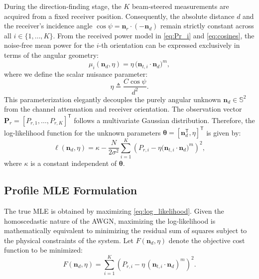 \documentclass[journal]{IEEEtran}
\begin{document}
During the direction-finding stage, the $K$ beam-steered measurements are acquired from a fixed receiver position. Consequently, the absolute distance $d$ and the receiver's incidence angle $\cos\psi = \mathbf{n}_r \cdot (-\mathbf{n}_d)$ remain strictly constant across all $i \in \{1, \dots, K\}$. From the received power model in \eqref{eq:Pr_i} and \eqref{eq:cosines}, the noise-free mean power for the $i$-th orientation can be expressed exclusively in terms of the angular geometry:
\begin{equation}
    \mu_i(\mathbf{n}_d, \eta) = \eta\,\bigl(\mathbf{n}_{t,i}\cdot\mathbf{n}_d\bigr)^{m},
    \label{eq:mu_eta}
\end{equation}
where we define the scalar nuisance parameter:
\begin{equation}
    \eta \triangleq \frac{C\cos\psi}{d^{2}}.
    \label{eq:eta_def}
\end{equation}
This parameterization elegantly decouples the purely angular unknown $\mathbf{n}_d \in \mathbb{S}^{2}$ from the channel attenuation and receiver orientation. The observation vector $\mathbf{P}_r = [P_{r,1}, \dots, P_{r,K}]^{\mathsf{T}}$ follows a multivariate Gaussian distribution. Therefore, the log-likelihood function for the unknown parameters $\boldsymbol{\theta} = [\mathbf{n}_d^{\mathsf{T}}, \eta]^{\mathsf{T}}$ is given by:
\begin{equation}
    \ell(\mathbf{n}_d, \eta) = \kappa - \frac{N}{2\sigma^2} \sum_{i=1}^{K} \left( P_{r,i} - \eta \bigl(\mathbf{n}_{t,i}\cdot\mathbf{n}_d\bigr)^{m} \right)^2,
    \label{eq:log_likelihood}
\end{equation}
where $\kappa$ is a constant independent of $\boldsymbol{\theta}$.

\subsection{Profile MLE Formulation}

The true MLE is obtained by maximizing \eqref{eq:log_likelihood}. Given the homoscedastic nature of the AWGN, maximizing the log-likelihood is mathematically equivalent to minimizing the residual sum of squares subject to the physical constraints of the system. Let $F(\mathbf{n}_d, \eta)$ denote the objective cost function to be minimized:
\begin{equation}
  F(\mathbf{n}_d, \eta) = \sum_{i=1}^{K} \left( P_{r,i} - \eta\,(\mathbf{n}_{t,i}\cdot\mathbf{n}_d)^{m} \right)^{2}.
  \label{eq:nls_cost}
\end{equation}
\end{document}
